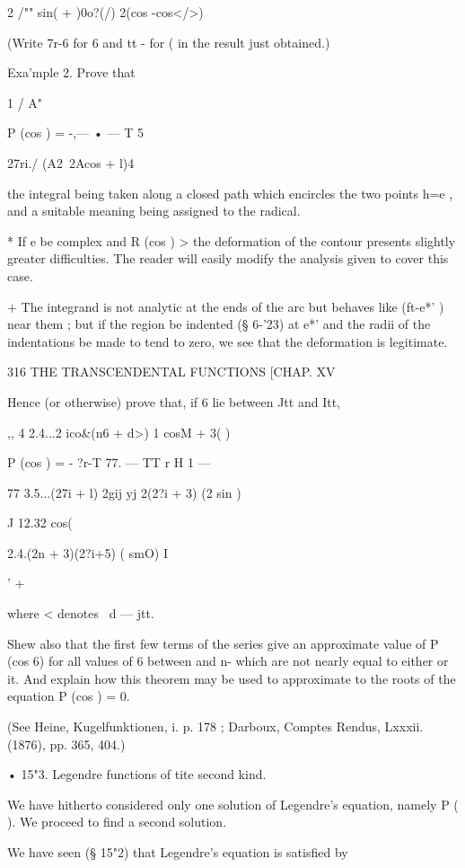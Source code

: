 {{2 /"" sin( + )0o?(/) 2(cos -cos</>)

(Write 7r-6 for 6 and tt - for ( in the result just obtained.)

Exa'mple 2. Prove that

1 / A"

P (cos ) = -,— • — T 5

27ri./ (A2\ 2Acos + l)4

the integral being taken along a closed path which encircles the two
points h=e , and a suitable meaning being assigned to the radical.

* If e be complex and R (cos ) > the deformation of the contour
presents slightly greater difficulties. The reader will easily modify
the analysis given to cover this case.

+ The integrand is not analytic at the ends of the arc but behaves
like (ft-e*' )~ near them ; but if the region be indented (§ 6-'23) at
e*' and the radii of the indentations be made to tend to zero, we see
that the deformation is legitimate.



316 THE TRANSCENDENTAL FUNCTIONS [CHAP. XV

Hence (or otherwise) prove that, if 6 lie between Jtt and Itt,

,, 4 2.4...2 ico\&(n6 + d>) 1 cosM + 3( )\

P (cos ) = - ?r-T 77. — TT r H 1 —

77 3.5...(27i + l) 2gij yj 2(2?i + 3) (2 sin )

J 12.32 cos(%

2.4.(2n + 3)(2?i+5) ( smO) I

' +

where < denotes \ d — jtt.

Shew also that the first few terms of the series give an approximate
value of P (cos 6) for all values of 6 between and n- which are not
nearly equal to either or it. And explain how this theorem may be used
to approximate to the roots of the equation P (cos ) = 0.

(See Heine, Kugelfunktionen, i. p. 178 ; Darboux, Comptes Rendus,
Lxxxii. (1876), pp. 365, 404.)

• 15"3. Legendre functions of tite second kind.

We have hitherto considered only one solution of Legendre's equation,
namely P ( ). We proceed to find a second solution.

We have seen (§ 15"2) that Legendre's equation is satisfied by



}}

